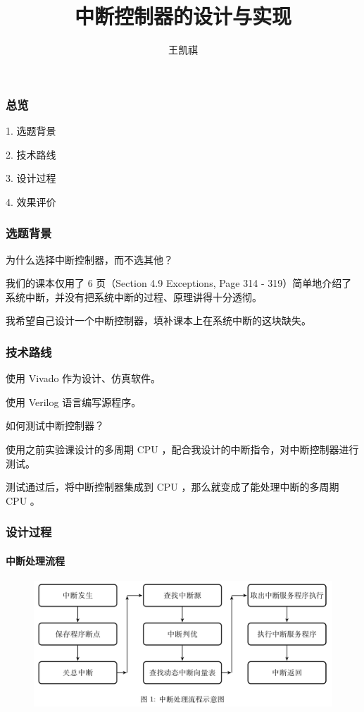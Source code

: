\documentclass[xcolor=dvipsnames]{beamer}
\begin{document}
\normalsize
\title{中断控制器的设计与实现}
\author {王凯祺}


\begin{frame}
\titlepage
\end{frame}

\begin{frame}
	\frametitle{总览}
	
	1. 选题背景
	
	2. 技术路线
	
	3. 设计过程
	
	4. 效果评价
\end{frame}

\begin{frame}
    \frametitle{选题背景}
    
    为什么选择中断控制器，而不选其他？
    
    \pause
    
    我们的课本仅用了 6 页（Section 4.9 Exceptions, Page 314 - 319）简单地介绍了系统中断，并没有把系统中断的过程、原理讲得十分透彻。
    
    我希望自己设计一个中断控制器，填补课本上在系统中断的这块缺失。
	
\end{frame}

\begin{frame}
	\frametitle{技术路线}

	使用 Vivado 作为设计、仿真软件。
	
	使用 Verilog 语言编写源程序。
	
	如何测试中断控制器？
	
	\pause
	
	使用之前实验课设计的多周期 CPU ，配合我设计的中断指令，对中断控制器进行测试。
	
	测试通过后，将中断控制器集成到 CPU ，那么就变成了能处理中断的多周期 CPU 。

\end{frame}

\begin{frame}
	\frametitle{设计过程}
	\framesubtitle{中断处理流程}
	
	\begin{figure}
		\centering
		\includegraphics[scale=0.25]{img/1.png}
	\end{figure}
\end{frame}
\end{document}
